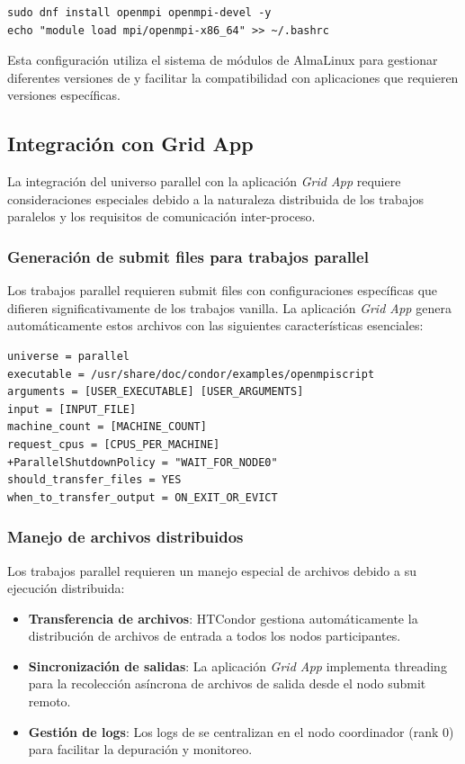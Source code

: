 \begin{verbatim}
sudo dnf install openmpi openmpi-devel -y
echo "module load mpi/openmpi-x86_64" >> ~/.bashrc
\end{verbatim}

Esta configuración utiliza el sistema de módulos de AlmaLinux para gestionar diferentes versiones de \MPI y facilitar la compatibilidad con aplicaciones que requieren versiones específicas.

\subsection{Integración con Grid App}
\noindent

La integración del universo parallel con la aplicación \textit{Grid App} requiere consideraciones especiales debido a la naturaleza distribuida de los trabajos paralelos y los requisitos de comunicación inter-proceso.

\subsubsection{Generación de submit files para trabajos parallel}
\noindent

Los trabajos parallel requieren submit files con configuraciones específicas que difieren significativamente de los trabajos vanilla. La aplicación \textit{Grid App} genera automáticamente estos archivos con las siguientes características esenciales:

\begin{verbatim}
universe = parallel
executable = /usr/share/doc/condor/examples/openmpiscript
arguments = [USER_EXECUTABLE] [USER_ARGUMENTS]
input = [INPUT_FILE]
machine_count = [MACHINE_COUNT]
request_cpus = [CPUS_PER_MACHINE]
+ParallelShutdownPolicy = "WAIT_FOR_NODE0"
should_transfer_files = YES
when_to_transfer_output = ON_EXIT_OR_EVICT
\end{verbatim}

\subsubsection{Manejo de archivos distribuidos}
\noindent

Los trabajos parallel requieren un manejo especial de archivos debido a su ejecución distribuida:

\begin{itemize}
	\item \textbf{Transferencia de archivos}: HTCondor gestiona automáticamente la distribución de archivos de entrada a todos los nodos participantes.
	
	\item \textbf{Sincronización de salidas}: La aplicación \textit{Grid App} implementa threading para la recolección asíncrona de archivos de salida desde el nodo submit remoto.
	
	\item \textbf{Gestión de logs}: Los logs de \MPI se centralizan en el nodo coordinador (rank 0) para facilitar la depuración y monitoreo.
\end{itemize}

